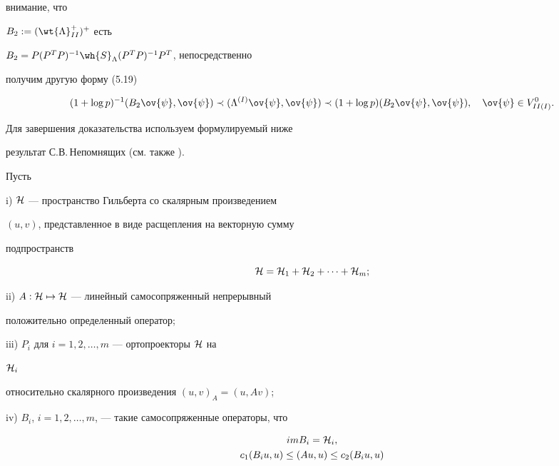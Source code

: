 внимание, что 


$B_2:=(\wt{\Lambda}^+_{II})^+$ есть 


$B_2 = P(P^TP)^{-1}\wh{S}_\Lambda(P^TP)^{-1}P^T$, непосредственно 


получим другую форму (5.19)


\begin{equation}\label{eq20}


(1+\log p)^{-1}(B_2 \ov{\psi},\ov{\psi}) \prec


(\Lambda^{(I)}\ov{\psi},\ov{\psi}) \prec (1+\log p)


(B_2 \ov{\psi},\ov{\psi}), \quad \ov{\psi} \in V^0_{II(I)}.


\end{equation}


Для завершения доказательства используем формулируемый ниже 


результат С.В.\,Не\-по\-м\-ня\-щих \cite{nepom} (см. также \cite{lions}). 





Пусть





i) ${\cal H}$ --- пространство Гильберта со скалярным произведением


$(u,v)$, представленное в виде расщепления на векторную сумму 


подпространств 


$$


{\cal H}={\cal H}_1+{\cal H}_2+\dotsb+{\cal H}_m;


$$





ii) $A:{\cal H}\mapsto{\cal H}$ --- линейный самосопряженный непрерывный


положительно определенный оператор;





iii) $P_{i}$ для $i=1,2,\dotsc,m$ --- ортопроекторы ${\cal H}$ на


${\cal H}_i$ 


относительно скалярного произведения $(u,v)_A=(u,Av)$;





iv) $B_i$, $i=1,2,\dotsc,m$, --- такие самосопряженные операторы, что 


\begin{gather*}


imB_i={\cal H}_i,\\ 


c_1(B_iu,u)\leq (Au,u)\leq c_2(B_iu,u)


\end{gather*}


